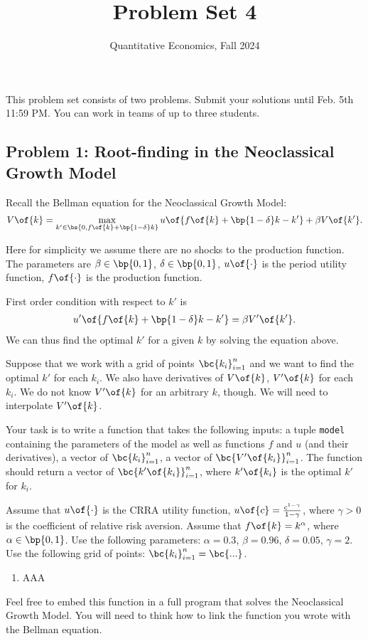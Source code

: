 \documentclass[english,hyperref={pdftex,pdfpagemode=UseNone,hidelinks}]{tufte-handout}
\title{Problem Set 4}
\author{Quantitative Economics, Fall 2024}
\begin{document}
\maketitle
This problem set consists of two problems. Submit your solutions until Feb. 5th 11:59 PM. You can work in teams of up to three students.   



\subsection*{Problem 1: Root-finding in the Neoclassical Growth Model} 

Recall the Bellman equation for the Neoclassical Growth Model:
\begin{align*}
V\of{k} = \max_{k'\in \bs{0,f\of{k} + \bp{1-\delta}k}} u\of{f\of{k} + \bp{1-\delta}k - k'} + \beta V\of{k'}.
\end{align*}

Here for simplicity we assume there are no shocks to the production function. The parameters are $\beta\in\bp{0,1}$, $\delta\in\bp{0,1}$, $u\of{\cdot}$ is the period utility function, $f\of{\cdot}$ is the production function.


First order condition with respect to $k'$ is 
\begin{align*}
u'\of{f\of{k} + \bp{1-\delta}k - k'} = \beta V'\of{k'}.
\end{align*}
We can thus find the optimal $k'$ for a given $k$ by solving the equation above.

Suppose that we work with a grid of points $\bc{k_i}_{i=1}^n$ and we want to find the optimal $k'$ for each $k_i$. We also have derivatives of $V\of{k}$, $V'\of{k}$ for each $k_i$. We do not know $V'\of{k}$ for an arbitrary $k$, though. We will need to interpolate $V'\of{k}$.


Your task is to write a function that takes the following inputs: a tuple \texttt{model} containing the parameters of the model as well as functions $f$ and $u$ (and their derivatives), a vector of  $\bc{k_i}_{i=1}^n$, a vector of $\bc{V'\of{k_i}}_{i=1}^n$. The function should return a vector of $\bc{k'\of{k_i}}_{i=1}^n$, where $k'\of{k_i}$ is the optimal $k'$ for $k_i$. 

Assume that $u\of{\cdot}$ is the CRRA utility function, $u\of{c} = \frac{c^{1-\gamma}}{1-\gamma}$, where $\gamma>0$ is the coefficient of relative risk aversion. Assume that $f\of{k} = k^\alpha$, where $\alpha\in\bp{0,1}$. Use the following parameters: $\alpha = 0.3$, $\beta = 0.96$, $\delta = 0.05$, $\gamma = 2$. Use the following grid of points: $\bc{k_i}_{i=1}^n = \bc{...}$. 
\begin{enumerate}

\item AAA
\end{enumerate}

Feel free to embed this function in a full program that solves the Neoclassical Growth Model.  You will need to think how to link the function you wrote with the Bellman equation.
\end{document}

